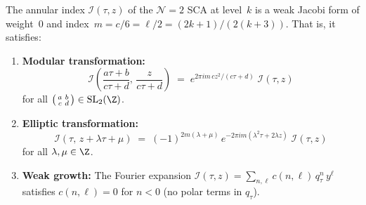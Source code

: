 \begin{theorem}%
\label{thm:weak-jacobi-annular}%
%
%
The annular index $\mathcal{I}(\tau,z)$ of the
$\mathcal N=2$ SCA at level~$k$ is a weak Jacobi form
of weight~$0$ and index~$m = c/6 = \ell/2 = (2k+1)/(2(k+3))$.
That is, it satisfies:
\begin{enumerate}[label=\textup{(\alph*)}]
\item \textbf{Modular transformation:}
 \[
 \mathcal{I}\!\left(\frac{a\tau+b}{c\tau+d},\,
 \frac{z}{c\tau+d}\right)
 \;=\;
 e^{2\pi i m\,cz^2/(c\tau+d)}\;
 \mathcal{I}(\tau,z)
 \]
 for all
 $\bigl(\begin{smallmatrix}a&b\\c&d\end{smallmatrix}\bigr)
 \in\mathrm{SL}_2(\Z)$.

\item \textbf{Elliptic transformation:}
 \[
 \mathcal{I}(\tau,\,z+\lambda\tau+\mu)
 \;=\;
 (-1)^{2m(\lambda+\mu)}\,
 e^{-2\pi i m(\lambda^2\tau+2\lambda z)}\;
 \mathcal{I}(\tau,z)
 \]
 for all $\lambda,\mu\in\Z$.

\item \textbf{Weak growth:}
 The Fourier expansion
 $\mathcal{I}(\tau,z)
 = \sum_{n,\ell} c(n,\ell)\,q_\tau^n\,y^\ell$
 satisfies $c(n,\ell) = 0$ for $n < 0$
 (no polar terms in $q_\tau$).
\end{enumerate}
\end{theorem}

